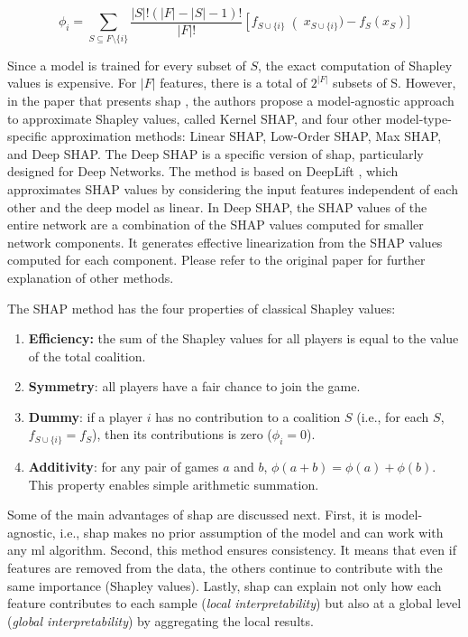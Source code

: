 \begin{equation}
\label{eq:shapley-values}
\phi_i = \sum_{S \subseteq F \setminus \{i\}} \frac{\left|S\right|!(\left|F\right| - \left|S\right| - 1)!}{\left|F\right|!}\left[f_{S \cup \{i\}}\right (x_{S \cup \{i\}}) - f_S(x_S)]
\end{equation}

Since a model is trained for every subset of $S$, the exact computation of Shapley values is expensive. For $\left|F\right|$ features, there is a total of $2^{\left|F\right|}$ subsets of S. However, in the paper that presents \acs{shap} \citep{shap2018}, the authors propose a model-agnostic approach to approximate Shapley values, called Kernel SHAP, and four other model-type-specific approximation methods: Linear SHAP, Low-Order SHAP, Max SHAP, and Deep SHAP. The Deep SHAP is a specific version of \acs{shap}, particularly designed for Deep Networks. The method is based on DeepLift \citep{deeplift_old, deeplift_new}, which approximates SHAP values by considering the input features independent of each other and the deep model as linear. In Deep SHAP, the SHAP values of the entire network are a combination of the SHAP values computed for smaller network components. It generates effective linearization from the SHAP values computed for each component. Please refer to the original paper for further explanation of other methods.

The SHAP method has the four properties of classical Shapley values:

\begin{enumerate}
\item \textbf{Efficiency:} the sum of the Shapley values for all players is equal to the value of the total coalition. 
\item \textbf{Symmetry}: all players have a fair chance to join the game.
\item \textbf{Dummy}: if a player $i$ has no contribution to a coalition $S$ (i.e., for each $S$, $f_{S \cup \{i\}} = f_S$), then its contributions is zero ($\phi_i = 0$).
\item \textbf{Additivity}: for any pair of games $a$ and $b$, $\phi(a + b) = \phi(a) + \phi(b)$. This property enables simple arithmetic summation.
\end{enumerate}

Some of the main advantages of \acs{shap} are discussed next. First, it is model-agnostic, i.e., \acs{shap} makes no prior assumption of the model and can work with any \acs{ml} algorithm. Second, this method ensures consistency. It means that even if features are removed from the data, the others continue to contribute with the same importance (Shapley values). Lastly, \acs{shap} can explain not only how each feature contributes to each sample (\textit{local interpretability}) but also at a global level (\textit{global interpretability}) by aggregating the local results.

